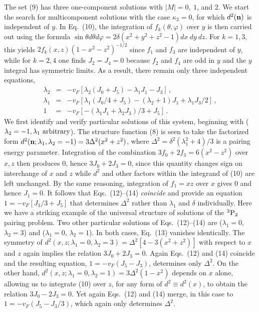 The set (9) has three one-component solutions \cite{tak,ost} with 
$|M|=0,~1$, and 2.  We start the search for multicomponent solutions
with the case $\kappa_2=0$, for which $d^2({\bf n})$ is independent 
of $y$. In Eq.~(10), the integration of $f_k(\theta,\varphi)$ 
over $y$ is then carried out using the formula 
$\sin\theta d\theta d\varphi =2\delta(x^2+y^2+z^2-1)dx~dy~dz$.  
For $k=1,3$, this yields $2f_k(x,z)(1-x^2-z^2)^{-1/2}$ 
since $f_1$ and $f_3$ are independent of $y$, while for $k=2,4$ 
one finds $J_2=J_4=0$ because $f_2$ and $f_4$ are odd in $y$ 
and the $y$ integral has symmetric limits.  As a result, 
there remain only three independent equations,
\begin{eqnarray}
\lambda_2 &=& -v_F[\lambda_2(J_0+J_5) -\lambda_1 J_1-J_3] \, ,\\
\lambda_1 &=& -v_F[\lambda_1(J_0/4+J_5)-(\lambda_2+1)J_1
              +\lambda_1 J_3/2] \, ,\\
        1 &=& -v_F[-(\lambda_1 J_1+\lambda_2 J_3)/3+J_5] \, .
\end{eqnarray}
We first identify and verify particular solutions of this system,
beginning with ($\lambda_2=-1,\lambda_1~{\rm arbitrary}$).
The structure function (8) is seen to take the factorized form
$d^2({\bf n};\lambda_1,\lambda_2=-1)=3\Delta^2(x^2+z^2)$, where 
$\Delta^2=\delta^2(\lambda^2_1+4)/3$ is a pairing energy parameter. 
Integration of the combination $3f_0+2f_3=6(x^2-z^2)$ over $x,z$ 
then produces 0, hence $3J_0+2J_3=0$, since this quantity changes 
sign on interchange of $x$ and $z$ while $d^2$ and other factors 
within the integrand of (10) are left unchanged.  By the same reasoning, 
integration of $f_1=xz$ over $x$ gives 0 and hence $J_1=0$.  
It follows that Eqs.~(12)--(14) {\it coincide} and provide an 
equation $1=-v_F[J_3/3+J_5]$ that determines $\Delta^2$ rather 
than $\lambda_1$ and $\delta$ individually.  Here we have a striking 
example of the universal structure of solutions of the $^3{\rm P}_2$ 
pairing problem.  Two other particular solutions of Eqs.~(12)--(14) 
are ($\lambda_1=0$, $\lambda_2=3$) and ($\lambda_1=0$, $\lambda_2=1$). 
In both cases, Eq.~(13) vanishes identically.  The symmetry 
of $d^2(x,z;\lambda_1=0,\lambda_2=3)=\Delta^2[4-3(x^2+z^2)]$
with respect to $x$ and $z$ again implies the relation $3J_0+2J_3=0$.  
Again Eqs.~(12) and (14) coincide and the resulting equation, 
$1=-v_F(J_5-J_3)$, determines only $\Delta^2$.  On the other hand, 
$d^2(x,z;\lambda_1=0,\lambda_2=1)=3\Delta^2(1-x^2)$ depends on $x$ 
alone, allowing us to integrate (10) over $z$, for any form of
$d^2\equiv d^2(x)$, to obtain the relation $3J_0-2J_3=0$.  Yet
again Eqs.~(12) and (14) merge, in this case to $1=-v_F(J_5-J_3/3)$, 
which again only determines $\Delta^2$.

